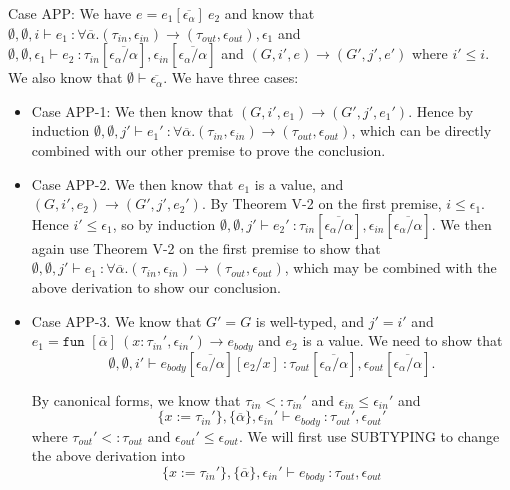 \documentclass{article}
\begin{document}
Case APP: We have $e = e_1[\overline{\epsilon_\alpha}]\ e_2$ and know that $\emptyset, \emptyset, i \vdash e_1\ \colon \forall \overline \alpha.(\tau_{in}, \epsilon_{in}) \rightarrow (\tau_{out}, \epsilon_{out}), \epsilon_1$ and $\emptyset, \emptyset, \epsilon_1 \vdash e_2\ \colon \tau_{in}[\overline{\epsilon_\alpha/\alpha}], \epsilon_{in}[\overline{\epsilon_\alpha/\alpha}]$ and $(G, i', e) \rightarrow (G', j', e')$ where $i' \leq i$. We also know that $\emptyset \vdash \overline{\epsilon_\alpha}$. We have three cases:
\begin{itemize}
	\item Case APP-1: We then know that $(G, i', e_1) \rightarrow (G', j', e_1')$. Hence by induction $\emptyset, \emptyset, j' \vdash e_1'\ \colon \forall \overline \alpha.(\tau_{in}, \epsilon_{in}) \rightarrow (\tau_{out}, \epsilon_{out})$, which can be directly combined with our other premise to prove the conclusion.
	\item Case APP-2. We then know that $e_1$ is a value, and $(G, i', e_2) \rightarrow (G', j', e_2')$. By Theorem V-2 on the first premise, $i \leq \epsilon_1$. Hence $i' \leq \epsilon_1$, so by induction $\emptyset, \emptyset, j' \vdash e_2'\ \colon \tau_{in}[\overline{\epsilon_\alpha/\alpha}], \epsilon_{in}[\overline{\epsilon_\alpha/\alpha}]$. We then again use Theorem V-2 on the first premise to show that $\emptyset, \emptyset, j' \vdash e_1\ \colon \forall \overline \alpha.(\tau_{in}, \epsilon_{in}) \rightarrow (\tau_{out}, \epsilon_{out})$, which may be combined with the above derivation to show our conclusion.
	\item Case APP-3. We know that $G' = G$ is well-typed, and $j' = i'$ and $e_1 = \texttt{fun } [\overline \alpha]\ (x : \tau_{in}', \epsilon_{in}') \rightarrow e_{body}$ and $e_2$ is a value. 
	We need to show that 
	$$\emptyset, \emptyset, i' \vdash e_{body}[\overline{\epsilon_\alpha/\alpha}][e_2/x]\ \colon \tau_{out}[\overline{\epsilon_\alpha/\alpha}], \epsilon_{out}[\overline{\epsilon_\alpha/\alpha}].$$
	
	By canonical forms, we know that $\tau_{in} <: \tau_{in}'$ and $\epsilon_{in} \leq \epsilon_{in}'$ and $$\{x := \tau_{in}'\}, \{\overline\alpha\}, \epsilon_{in}' \vdash e_{body}\ \colon \tau_{out}', \epsilon_{out}'$$ where $\tau_{out}' <: \tau_{out}$ and $\epsilon_{out}' \leq \epsilon_{out}$.
	We will first use SUBTYPING to change the above derivation into
	$$\{x := \tau_{in}'\}, \{\overline\alpha\}, \epsilon_{in}' \vdash e_{body}\ \colon \tau_{out}, \epsilon_{out}$$
	

\end{itemize}
\end{document}
